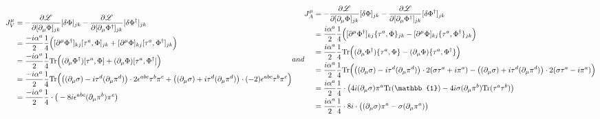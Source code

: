 \begin{subequations}
    \begin{align}
        J^\mu_V & =-\frac{\partial\mathscr{L}}{\partial[\partial_\mu\Phi]_{jk}}[\delta\Phi]_{jk}-\frac{\partial\mathscr{L}}{\partial[\partial_\mu\Phi^\dagger]_{jk}}[\delta\Phi^\dagger]_{jk}                                                                      \\
                & =\frac{-\imagu\alpha^a}{2}\frac{1}{4}\Big([\partial^\mu\Phi^\dagger]_{kj}[\tau^a,\Phi]_{jk}+[\partial^\mu\Phi]_{kj}[\tau^a,\Phi^\dagger]_{jk}\Big)                                                                                               \\
                & =\frac{-\imagu\alpha^a}{2}\frac{1}{4}\Tr\Big((\partial_\mu\Phi^\dagger)[\tau^a,\Phi]+(\partial_\mu\Phi)[\tau^a,\Phi^\dagger]\Big)                                                                                                                \\
                & =\frac{-\imagu\alpha^a}{2}\frac{1}{4}\Tr\Big(\big((\partial_\mu\sigma)-\imagu\tau^d(\partial_\mu\pi^d)\big)\cdot2\epsilon^{abc}\tau^b\pi^c+\big((\partial_\mu\sigma)+\imagu\tau^d(\partial_\mu\pi^d)\big)\cdot(-2)\epsilon^{abc}\tau^b\pi^c\Big) \\
                & =\frac{-\imagu\alpha^a}{2}\frac{1}{4}\cdot\big(-8\imagu\epsilon^{abc}(\partial_\mu\pi^b)\pi^c\big)
    \end{align}
    and
    \begin{align}
        J^\mu_A & =-\frac{\partial\mathscr{L}}{\partial[\partial_\mu\Phi]_{jk}}[\delta\Phi]_{jk}-\frac{\partial\mathscr{L}}{\partial[\partial_\mu\Phi^\dagger]_{jk}}[\delta\Phi^\dagger]_{jk}                                                                    \\
                & =\frac{\imagu\alpha^a}{2}\frac{1}{4}\Big([\partial^\mu\Phi^\dagger]_{kj}\{\tau^a,\Phi\}_{jk}-[\partial^\mu\Phi]_{kj}\{\tau^a,\Phi^\dagger\}_{jk}\Big)                                                                                          \\
                & =\frac{\imagu\alpha^a}{2}\frac{1}{4}\Tr\Big((\partial_\mu\Phi^\dagger)\{\tau^a,\Phi\}-(\partial_\mu\Phi)\{\tau^a,\Phi^\dagger\}\Big)                                                                                                           \\
                & =\frac{\imagu\alpha^a}{2}\frac{1}{4}\Tr\Big(\big((\partial_\mu\sigma)-\imagu\tau^d(\partial_\mu\pi^d)\big)\cdot2(\sigma\tau^a+\imagu\pi^a)-\big((\partial_\mu\sigma)+\imagu\tau^d(\partial_\mu\pi^d)\big)\cdot2(\sigma\tau^a-\imagu\pi^a)\Big) \\
                & =\frac{\imagu\alpha^a}{2}\frac{1}{4}\cdot\big(4\imagu(\partial_\mu\sigma)\pi^a\Tr(\mathbb{1})-4\imagu\sigma(\partial_\mu\pi^b)\Tr(\tau^a\tau^b)\big)                                                                                           \\
                & =\frac{\imagu\alpha^a}{2}\frac{1}{4}\cdot8\imagu\cdot\big((\partial_\mu\sigma)\pi^a-\sigma(\partial_\mu\pi^a)\big)
    \end{align}
\end{subequations}